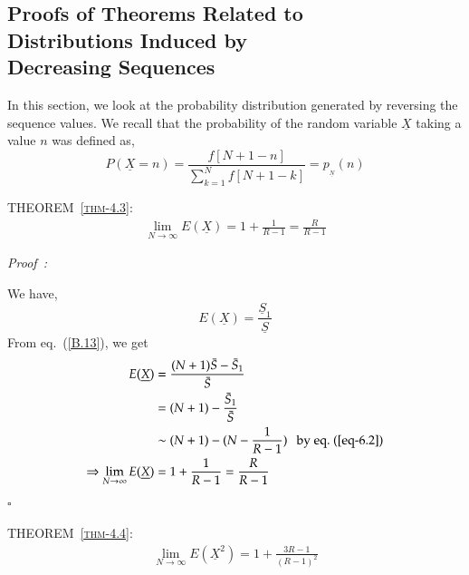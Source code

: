 \begin{multicols}{2}
\newpage

\section{Proofs of Theorems Related to\\ Distributions Induced by\\ Decreasing Sequences}\label{section-7}

In this section, we look at the probability distribution generated by reversing the sequence values. We recall that the probability of the random variable $\underline{X}$ taking a value $n$ was defined as, 
\begin{equation}
P(\underline{X} = n) =\frac{f[N+1-n]}{\displaystyle{\sum_{k=1}^{N}f[N+1-k]}} = p_{_{\underline{N}}}(n)\label{eq-7.1}
\end{equation}

\vspace{-.6cm}

\textsc{THEOREM~{\ref{thm-4.3}}:}
\begin{eqnarray*}
\displaystyle{\lim_{N \rightarrow \infty}}E(\underline{X}) = 1 + \displaystyle{\frac{1}{R-1}} =  \displaystyle{\frac{R}{R-1}}
\end{eqnarray*}

\vspace{-.5cm}

{\it Proof~:}

We have,
\begin{equation}
E(\underline{X}) = \frac{\underline{S}_1}{\underline{S}}
\end{equation}
From eq.~(\ref{B.13}), we get
\begin{align}
E(\underline{X}) &= \frac{(N+1)\bar{S} - \bar{S}_1}{\bar{S}}\nonumber\\
&= (N+1) - \frac{\bar{S}_1}{\bar{S}}\nonumber\\
&\sim (N+1) - (N - \frac{1}{R-1}) \hspace{0.1in}\textup{by eq.~(\ref{eq-6.2}})\nonumber\\
\Rightarrow  \lim_{N\rightarrow \infty}E(\underline{X}) &= 1 + \displaystyle{\frac{1}{R-1}} = \displaystyle{\frac{R}{R-1}}\label{eq-7.3}
\end{align}
\hfill{$\square$}\\

\vspace{-.8cm}

\textsc{THEOREM~{\ref{thm-4.4}}:}
\begin{eqnarray*}
\displaystyle{\lim_{N \rightarrow \infty}}E(\underline{X}^2) = 1 + \displaystyle{\frac{3R-1}{(R-1)^2}}
\end{eqnarray*}


\end{multicols}
